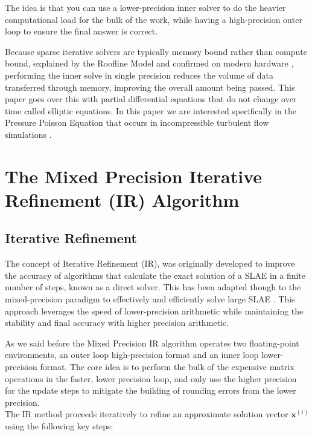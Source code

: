 \documentclass[a4paper,10.5pt,twoside]{article}
\begin{document}
    The idea is that you can use a lower-precision inner solver to do the heavier computational load for the bulk of the work, while having a high-precision outer loop to ensure the final answer is correct. 
    
    Because sparse iterative solvers are typically memory bound rather than compute bound, explained by the Roofline Model \autocite{williams2009roofline} and confirmed on modern hardware \autocite{Walden2021Performance}, performing the inner solve in single precision reduces the volume of data transferred through memory, improving the overall amount being passed. This paper goes over this with partial differential equations that do not change over time called elliptic equations. In this paper we are interested specifically in the Pressure Poisson Equation that occurs in incompressible turbulent flow simulations \autocite{chorin1968numerical}.

\section{The Mixed Precision Iterative Refinement (IR) Algorithm}\label{s:I}

\subsection{Iterative Refinement}

The concept of Iterative Refinement (IR), was originally developed to improve the accuracy of
algorithms that calculate the exact solution of a SLAE in a finite number of steps, known as a direct solver. \autocite{wilkinson1964rounding} This has been adapted though to the mixed-precision paradigm to effectively and efficiently solve large SLAE \autocite{Medvedev2021}. This approach leverages the speed of lower-precision arithmetic while maintaining the stability and final accuracy with higher precision arithmetic.


As we said before the Mixed Precision IR algorithm operates two floating-point environments, an outer loop high-precision format and an inner loop lower-precision format. The core idea is to perform the bulk of the expensive matrix operations in the faster, lower precision loop, and only use the higher precision for the update steps to mitigate the building of rounding errors from the lower precision. \\

The IR method proceeds iteratively to refine an approximate solution vector $\mathbf{x}^{(i)}$ using the following key steps:
\end{document}
